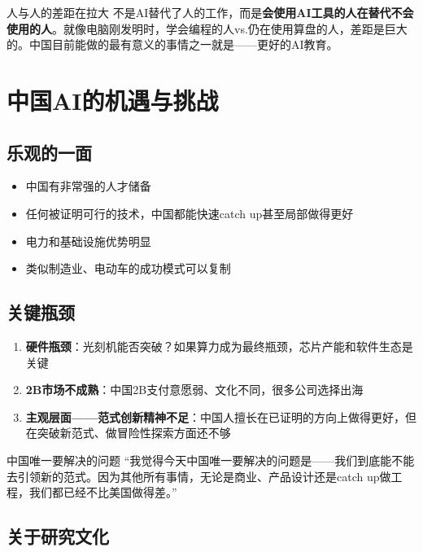 \documentclass[a4paper]{article}
\begin{document}
\begin{importantbox}{人与人的差距在拉大}
不是AI替代了人的工作，而是\textbf{会使用AI工具的人在替代不会使用的人}。就像电脑刚发明时，学会编程的人vs.仍在使用算盘的人，差距是巨大的。中国目前能做的最有意义的事情之一就是——更好的AI教育。
\end{importantbox}


\section{中国AI的机遇与挑战}

\subsection{乐观的一面}

\begin{itemize}
\item 中国有非常强的人才储备
\item 任何被证明可行的技术，中国都能快速catch up甚至局部做得更好
\item 电力和基础设施优势明显
\item 类似制造业、电动车的成功模式可以复制
\end{itemize}

\subsection{关键瓶颈}

\begin{enumerate}
\item \textbf{硬件瓶颈}：光刻机能否突破？如果算力成为最终瓶颈，芯片产能和软件生态是关键
\item \textbf{2B市场不成熟}：中国2B支付意愿弱、文化不同，很多公司选择出海
\item \textbf{主观层面——范式创新精神不足}：中国人擅长在已证明的方向上做得更好，但在突破新范式、做冒险性探索方面还不够
\end{enumerate}

\begin{warningbox}{中国唯一要解决的问题}
``我觉得今天中国唯一要解决的问题是——我们到底能不能去引领新的范式。因为其他所有事情，无论是商业、产品设计还是catch up做工程，我们都已经不比美国做得差。''
\end{warningbox}

\subsection{关于研究文化}
\end{document}
